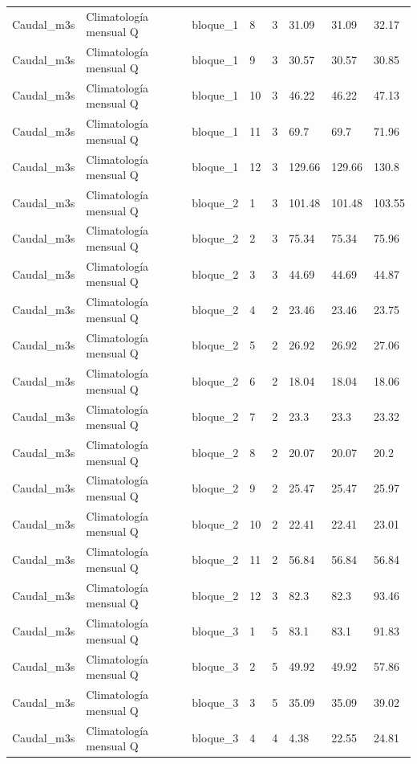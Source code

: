\begin{longtable}{llllllll}
Caudal\_m3s & Climatología mensual Q & bloque\_1 & 8 & 3 & 31.09 & 31.09 & 32.17 \\
Caudal\_m3s & Climatología mensual Q & bloque\_1 & 9 & 3 & 30.57 & 30.57 & 30.85 \\
Caudal\_m3s & Climatología mensual Q & bloque\_1 & 10 & 3 & 46.22 & 46.22 & 47.13 \\
Caudal\_m3s & Climatología mensual Q & bloque\_1 & 11 & 3 & 69.7 & 69.7 & 71.96 \\
Caudal\_m3s & Climatología mensual Q & bloque\_1 & 12 & 3 & 129.66 & 129.66 & 130.8 \\
Caudal\_m3s & Climatología mensual Q & bloque\_2 & 1 & 3 & 101.48 & 101.48 & 103.55 \\
Caudal\_m3s & Climatología mensual Q & bloque\_2 & 2 & 3 & 75.34 & 75.34 & 75.96 \\
Caudal\_m3s & Climatología mensual Q & bloque\_2 & 3 & 3 & 44.69 & 44.69 & 44.87 \\
Caudal\_m3s & Climatología mensual Q & bloque\_2 & 4 & 2 & 23.46 & 23.46 & 23.75 \\
Caudal\_m3s & Climatología mensual Q & bloque\_2 & 5 & 2 & 26.92 & 26.92 & 27.06 \\
Caudal\_m3s & Climatología mensual Q & bloque\_2 & 6 & 2 & 18.04 & 18.04 & 18.06 \\
Caudal\_m3s & Climatología mensual Q & bloque\_2 & 7 & 2 & 23.3 & 23.3 & 23.32 \\
Caudal\_m3s & Climatología mensual Q & bloque\_2 & 8 & 2 & 20.07 & 20.07 & 20.2 \\
Caudal\_m3s & Climatología mensual Q & bloque\_2 & 9 & 2 & 25.47 & 25.47 & 25.97 \\
Caudal\_m3s & Climatología mensual Q & bloque\_2 & 10 & 2 & 22.41 & 22.41 & 23.01 \\
Caudal\_m3s & Climatología mensual Q & bloque\_2 & 11 & 2 & 56.84 & 56.84 & 56.84 \\
Caudal\_m3s & Climatología mensual Q & bloque\_2 & 12 & 3 & 82.3 & 82.3 & 93.46 \\
Caudal\_m3s & Climatología mensual Q & bloque\_3 & 1 & 5 & 83.1 & 83.1 & 91.83 \\
Caudal\_m3s & Climatología mensual Q & bloque\_3 & 2 & 5 & 49.92 & 49.92 & 57.86 \\
Caudal\_m3s & Climatología mensual Q & bloque\_3 & 3 & 5 & 35.09 & 35.09 & 39.02 \\
Caudal\_m3s & Climatología mensual Q & bloque\_3 & 4 & 4 & 4.38 & 22.55 & 24.81 \\

\end{longtable}
